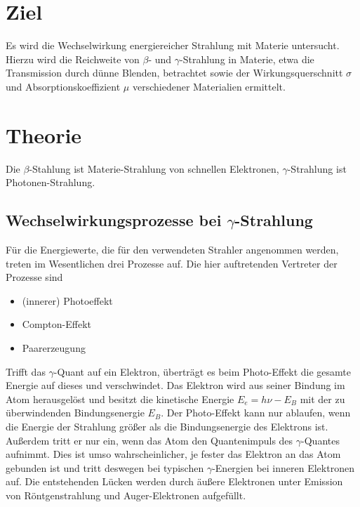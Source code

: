 \section{Ziel}
\label{sec:Ziel}
Es wird die Wechselwirkung energiereicher Strahlung mit Materie untersucht.
Hierzu wird die Reichweite von $\beta$- und $\gamma$-Strahlung in Materie, etwa die Transmission durch dünne Blenden, betrachtet sowie der Wirkungsquerschnitt $\sigma$ und Absorptionskoeffizient $\mu$ verschiedener Materialien ermittelt.

\section{Theorie}
\label{sec:Theorie}
Die $\beta$-Stahlung ist Materie-Strahlung von schnellen Elektronen, $\gamma$-Strahlung ist Photonen-Strahlung.

\subsection{Wechselwirkungsprozesse bei \texorpdfstring{$\gamma$}{Gamma}-Strahlung}
Für die Energiewerte, die für den verwendeten Strahler angenommen werden, treten im Wesentlichen drei Prozesse auf.
Die hier auftretenden Vertreter der Prozesse sind 
\begin{itemize}
	\item{(innerer) Photoeffekt}
	\item{Compton-Effekt}
	\item{Paarerzeugung}
\end{itemize}
Trifft das $\gamma$-Quant auf ein Elektron, überträgt es beim Photo-Effekt die gesamte Energie auf dieses und verschwindet. 
Das Elektron wird aus seiner Bindung im Atom herausgelöst und besitzt die kinetische Energie $E_e=h\nu-E_B$ mit der zu überwindenden Bindungsenergie $E_B$. 
Der Photo-Effekt kann nur ablaufen, wenn die Energie der Strahlung größer als die Bindungsenergie des Elektrons ist. 
Außerdem tritt er nur ein, wenn das Atom den Quantenimpuls des $\gamma$-Quantes aufnimmt. 
Dies ist umso wahrscheinlicher, je fester das Elektron an das Atom gebunden ist und tritt deswegen bei typischen $\gamma$-Energien bei inneren Elektronen auf. 
Die entstehenden Lücken werden durch äußere Elektronen unter Emission von Röntgenstrahlung und Auger-Elektronen aufgefüllt.

